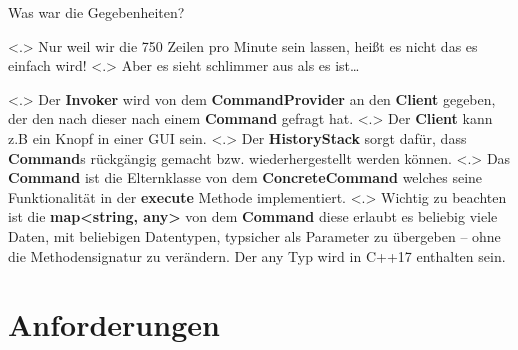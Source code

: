 \begin{frame}{Was war die Gegebenheiten?}
\begin{itemize}[<+- | alert@+>]
\begin{uncoverenv}
\begin{uncoverenv}
%
          \end{uncoverenv}%
              \note[item]<.>{
                Nur weil wir die 750 Zeilen pro Minute sein lassen, heißt es nicht das es einfach wird!
              }
              \note[item]<.>{
                Aber es sieht schlimmer aus als es ist\ldots
              }
          \action{}
        \end{uncoverenv}
            \note[item]<.>{
              Der \textbf{Invoker} wird von dem \textbf{CommandProvider} an den \textbf{Client} gegeben, der den nach dieser nach einem \textbf{Command} gefragt hat.
            }
            \note[item]<.>{
              Der \textbf{Client} kann z.B ein Knopf in einer GUI sein.
            }
            \note[item]<.>{
              Der \textbf{HistoryStack} sorgt dafür, dass \textbf{Command}s rückgängig gemacht bzw. wiederhergestellt werden können.
            }
            \note[item]<.>{
              Das \textbf{Command} ist die Elternklasse von dem \textbf{ConcreteCommand} welches seine Funktionalität in der \textbf{execute} Methode implementiert.
            }
            \note[item]<.>{
              Wichtig zu beachten ist die \textbf{map<string, any>} von dem \textbf{Command} diese erlaubt es beliebig viele Daten, mit beliebigen Datentypen, typsicher als Parameter zu übergeben -- ohne die Methodensignatur zu verändern. Der any Typ wird in C++17 enthalten sein.
            }
    \end{itemize}
  \end{frame}

\section{Anforderungen}

